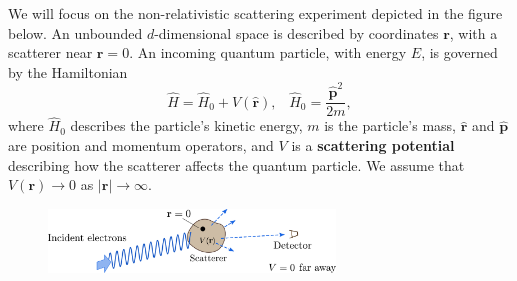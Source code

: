 \documentclass[pra,12pt]{revtex4}
\begin{document}
We will focus on the non-relativistic scattering experiment depicted
in the figure below.  An unbounded $d$-dimensional space is described
by coordinates $\mathbf{r}$, with a scatterer near $\mathbf{r} = 0$.
An incoming quantum particle, with energy $E$, is governed by the
Hamiltonian
\begin{equation}
  \hat{H} = \hat{H}_0 + V(\hat{\mathbf{r}}), \;\;\;
  \hat{H}_0 = \frac{\hat{\mathbf{p}}^2}{2m},
\end{equation}
where $\hat{H}_0$ describes the particle's kinetic energy, $m$ is the
particle's mass, $\hat{\mathbf{r}}$ and $\hat{\mathbf{p}}$ are
position and momentum operators, and $V$ is a \textbf{scattering
  potential} describing how the scatterer affects the quantum
particle.  We assume that $V(\mathbf{r}) \rightarrow 0$ as
$|\mathbf{r}| \rightarrow \infty$.

\begin{figure}[h]
  \centering\includegraphics[width=0.68\textwidth]{scattering}
\end{figure}
\end{document}
